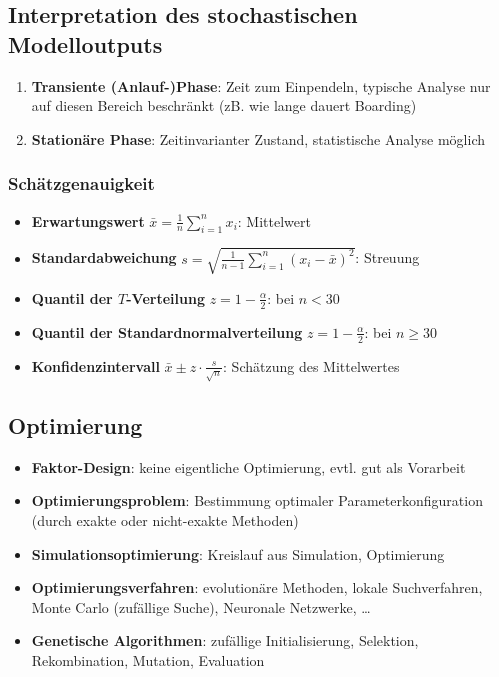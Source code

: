 \documentclass{article}
\begin{document}
\subsection{Interpretation des stochastischen Modelloutputs}
\begin{enumerate}
  \item \textbf{Transiente (Anlauf-)Phase}: Zeit zum Einpendeln, typische Analyse nur auf diesen Bereich beschränkt (zB. wie lange dauert Boarding)
  \item \textbf{Stationäre Phase}: Zeitinvarianter Zustand, statistische Analyse möglich
\end{enumerate}

\subsubsection{Schätzgenauigkeit}
\begin{itemize}
  \item \textbf{Erwartungswert} $\bar{x} = \frac{1}{n} \sum_{i=1}^n x_i$: Mittelwert
  \item \textbf{Standardabweichung} $s = \sqrt{\frac{1}{n-1} \sum_{i=1}^n (x_i - \bar{x})^2}$: Streuung
  \item \textbf{Quantil der $T$-Verteilung} $z=1-\frac{\alpha}{2}$: bei $n < 30$
  \item \textbf{Quantil der Standardnormalverteilung} $z=1-\frac{\alpha}{2}$: bei $n \geq 30$
  \item \textbf{Konfidenzintervall} $\bar{x} \pm z \cdot \frac{s}{\sqrt{n}}$: Schätzung des Mittelwertes
\end{itemize}

\subsection{Optimierung}
\begin{itemize}
  \item \textbf{Faktor-Design}: keine eigentliche Optimierung, evtl. gut als Vorarbeit
  \item \textbf{Optimierungsproblem}: Bestimmung optimaler Parameterkonfiguration (durch exakte oder nicht-exakte Methoden)
  \item \textbf{Simulationsoptimierung}: Kreislauf aus Simulation, Optimierung
  \item \textbf{Optimierungsverfahren}: evolutionäre Methoden, lokale Suchverfahren, Monte Carlo (zufällige Suche), Neuronale Netzwerke, …
  \item \textbf{Genetische Algorithmen}: zufällige Initialisierung, Selektion, Rekombination, Mutation, Evaluation
\end{itemize}
\end{document}
